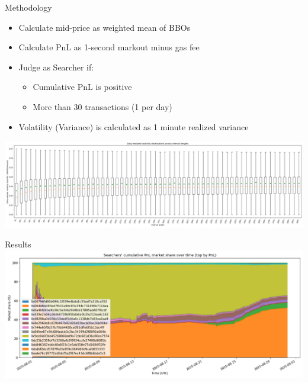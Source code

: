 \documentclass{beamer}
\begin{document}
\begin{frame}{Methodology}
  \begin{itemize}
    \item Calculate mid-price as weighted mean of BBOs
    \item Calculate PnL as 1-second markout minus gas fee
    \item Judge as Searcher if:
      \begin{itemize}
        \item Cumulative PnL is positive
        \item More than 30 transactions (1 per day)
      \end{itemize}
    \item Volatility (Variance) is calculated as 1 minute realized variance
  \end{itemize}
  \centering
  \includegraphics[width=\textwidth]{./images_goal_2/rv_boxplot_by_interval.png}
\end{frame}

\begin{frame}{Results}
  \centering
  \includegraphics[width=\textwidth]{./images_goal_2/market_share_over_time.png}
\end{frame}
\end{document}
